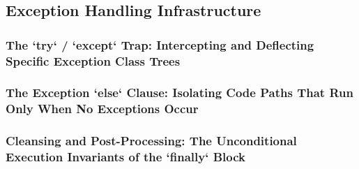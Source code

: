 \subsection{Exception Handling Infrastructure}
\subsubsection{The `try` / `except` Trap: Intercepting and Deflecting Specific Exception Class Trees}
\subsubsection{The Exception `else` Clause: Isolating Code Paths That Run Only When No Exceptions Occur}
\subsubsection{Cleansing and Post-Processing: The Unconditional Execution Invariants of the `finally` Block}

